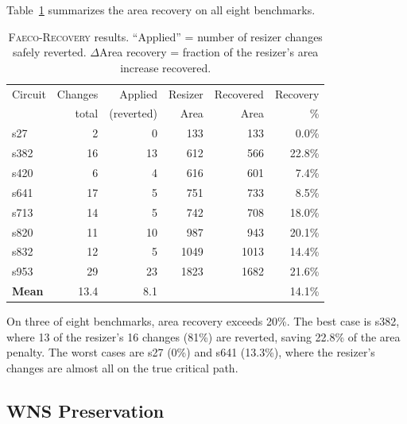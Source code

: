 \documentclass[journal]{IEEEtran}
\begin{document}
Table~\ref{tab:recovery} summarizes the area recovery on all eight
benchmarks.

\begin{table}[t]
\centering
\caption{\textsc{Faeco-Recovery} results. ``Applied'' = number of
resizer changes safely reverted. $\Delta$Area recovery = fraction of the
resizer's area increase recovered.}
\label{tab:recovery}
\renewcommand{\arraystretch}{1.1}
\begin{tabular}{lrrrrr}
\toprule
Circuit & Changes & Applied & Resizer & Recovered & Recovery \\
        & total   & (reverted) & Area & Area & \% \\
\midrule
s27  &  2 &  0 &  133 &  133 &  0.0\% \\
s382 & 16 & 13 &  612 &  566 & 22.8\% \\
s420 &  6 &  4 &  616 &  601 &  7.4\% \\
s641 & 17 &  5 &  751 &  733 &  8.5\% \\
s713 & 14 &  5 &  742 &  708 & 18.0\% \\
s820 & 11 & 10 &  987 &  943 & 20.1\% \\
s832 & 12 &  5 & 1049 & 1013 & 14.4\% \\
s953 & 29 & 23 & 1823 & 1682 & 21.6\% \\
\midrule
\textbf{Mean} & 13.4 & 8.1 &  &  & 14.1\% \\
\bottomrule
\end{tabular}
\end{table}

On three of eight benchmarks, area recovery exceeds 20\%. The best case is
s382, where 13 of the resizer's 16 changes (81\%) are reverted, saving
22.8\% of the area penalty. The worst cases are s27 (0\%) and s641
(13.3\%), where the resizer's changes are almost all on the true critical
path.

\subsection{WNS Preservation}
\end{document}
